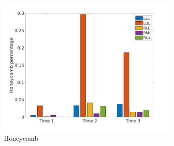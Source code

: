 \begin{figure}[H]
\begin{subfigure}{.46\linewidth}
  \includegraphics[width=\linewidth,trim={{.0\wd0} {.0\wd0} {.0\wd0} {.0\wd0}},clip]{QuantitativeAnalysis/Image/IPF21HoneycombLobarRegionDiseaseDistributionOverTime.jpg} %
  \caption{Honeycomb}
  \label{fig:IPF21LobarRegionDiseaseDistributionOverTimeMain-c} 
\end{subfigure} 
\hspace{.3in}
\begin{subfigure}{.46\linewidth}%

\end{subfigure}
\end{figure}

